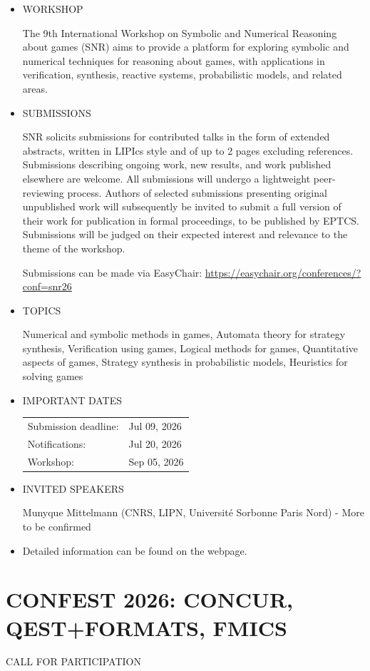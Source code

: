 \documentclass[prodmode,acmtecs]{acmsmall} %
\begin{document}
\begin{itemize}\item  WORKSHOP 
 
  The 9th International Workshop on Symbolic and Numerical Reasoning about games (SNR) aims to provide a platform for exploring symbolic and numerical techniques for reasoning about games, with applications in verification, synthesis, reactive systems, probabilistic models, and related areas. 
 
\item  SUBMISSIONS 
 
  SNR solicits submissions for contributed talks in the form of extended abstracts, written in LIPIcs style and of up to 2 pages excluding references. Submissions describing ongoing work, new results, and work published elsewhere are welcome. All submissions will undergo a lightweight peer-reviewing process. Authors of selected submissions presenting original unpublished work will subsequently be invited to submit a full version of their work for publication in formal proceedings, to be published by EPTCS. Submissions will be judged on their expected interest and relevance to the theme of the workshop. 
 
  Submissions can be made via EasyChair: \href{https://easychair.org/conferences/?conf=snr26}{https://easychair.org/conferences/?conf=snr26} 
 
\item  TOPICS 
 
   Numerical and symbolic methods in games, Automata theory for strategy synthesis, Verification using games, Logical methods for games, Quantitative aspects of games, Strategy synthesis in probabilistic models, Heuristics for solving games 
 
\item  IMPORTANT DATES 
 
\begin{tabulary}{\linewidth}{LL}Submission deadline:  & Jul 09, 2026 \\
Notifications:  & Jul 20, 2026 \\
Workshop:  & Sep 05, 2026 \\
\end{tabulary}
 
\item  INVITED SPEAKERS 
 
  Munyque Mittelmann (CNRS, LIPN, Université Sorbonne Paris Nord) - More to be confirmed 
 
\item  Detailed information can be found on the webpage. 
 
\end{itemize}\section{CONFEST 2026: CONCUR, QEST+FORMATS, FMICS }\label{CONFEST2026}CALL FOR PARTICIPATION 
\end{document}

